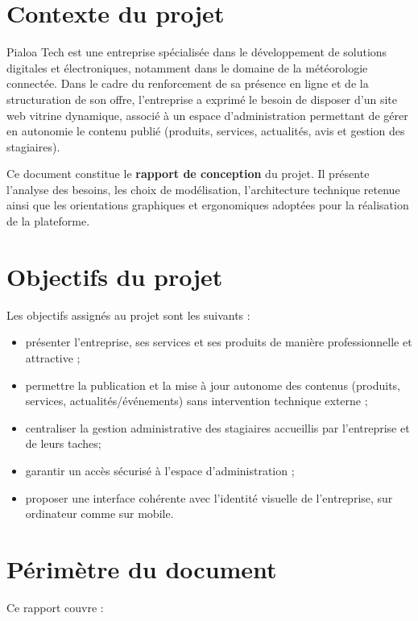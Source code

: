 \documentclass[11pt,a4paper]{report}
\begin{document}
\section{Contexte du projet}

Pialoa Tech est une entreprise spécialisée dans le développement de solutions
digitales et électroniques, notamment dans le domaine de la météorologie
connectée. Dans le cadre du renforcement de sa présence en ligne et de la
structuration de son offre, l'entreprise a exprimé le besoin de disposer d'un
site web vitrine dynamique, associé à un espace d'administration permettant
de gérer en autonomie le contenu publié (produits, services, actualités, avis et
gestion des stagiaires).

Ce document constitue le \textbf{rapport de conception} du projet. Il
présente l'analyse des besoins, les choix de modélisation, l'architecture
technique retenue ainsi que les orientations graphiques et ergonomiques
adoptées pour la réalisation de la plateforme.

\section{Objectifs du projet}

Les objectifs assignés au projet sont les suivants :

\begin{itemize}[leftmargin=1.2em]
    \item présenter l'entreprise, ses services et ses produits de manière
    professionnelle et attractive ;
    \item permettre la publication et la mise à jour autonome des contenus
    (produits, services, actualités/événements) sans intervention technique
    externe ;
    \item centraliser la gestion administrative des stagiaires accueillis par
    l'entreprise et de leurs taches;
    \item garantir un accès sécurisé à l'espace d'administration ;
    \item proposer une interface cohérente avec l'identité visuelle de
    l'entreprise, sur ordinateur comme sur mobile.
\end{itemize}

\section{Périmètre du document}

Ce rapport couvre :
\end{document}
